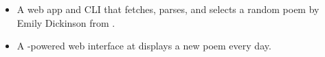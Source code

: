 \begin{itemize}[label=$\triangleright$]
    \item A web app and CLI that fetches, parses, and selects a random poem by Emily Dickinson from .
    \item A -powered web interface at  displays a new poem every day.
\end{itemize}
